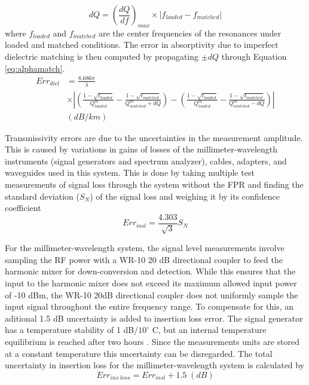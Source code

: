 \begin{equation}
dQ = \left(\frac{dQ}{df} \right)_{max} \times |f_{loaded} - f_{matched}|
\end{equation}
where $f_{loaded}$ and $ f_{matched}$ are the center frequencies of the resonances under loaded and matched conditions. The error in absorptivity due to imperfect dielectric matching is then computed by propagating $\pm dQ$ through Equation \ref{eq:alphamatch}.
\begin{equation}
\begin{split}
Err_{diel} &= \frac{8.686 \pi}{\lambda} 
\\ &\times \left| \left( \frac{1-\sqrt{t_{loaded}}}{Q^m_{loaded}} - \frac{1-\sqrt{t_{matched}}}{Q^m_{matched} + dQ} \right) - \left( \frac{1-\sqrt{t_{loaded}}}{Q^m_{loaded}} - \frac{1-\sqrt{t_{matched}}}{Q^m_{matched} - dQ} \right) \right|\\
 &(dB/km)
\end{split}
\end{equation}

Transmissivity errors are due to the uncertainties in the measurement amplitude. This is caused by variations in gains of losses of the millimeter-wavelength instruments (signal generators and spectrum analyzer), cables, adapters, and waveguides used in this system. This is done by taking multiple test measurements of signal loss through the system without the FPR and finding the standard deviation ($S_N$) of the signal loss and weighing it by its confidence coefficient
\begin{equation}
Err_{msl} = \frac{4.303}{\sqrt{3}}S_N
\end{equation}

For the millimeter-wavelength system, the signal level measurements involve sampling the RF power with a WR-10 20 dB directional coupler to feed the harmonic mixer for down-conversion and detection. While this ensures that the input to the harmonic mixer does not exceed its maximum allowed input power of -10 dBm, the WR-10 20dB directional coupler does not uniformly sample the input signal throughout the entire frequency range. To compensate for this, an aditional 1.5 dB uncertainty is added to insertion loss error. The signal generator has a temperature stability of 1 dB/$10^\circ$ C, but an internal temperature equilibrium is reached after two hours \cite{Hewlett-Packard}. Since the measurements units are stored at a constant temperature this uncertainty can be disregarded. The total uncertainty in insertion loss for the millimeter-wavelength system is calculated by
\begin{equation}
Err_{ins\;loss} = Err_{msl} +1.5\;(dB)
\end{equation}

